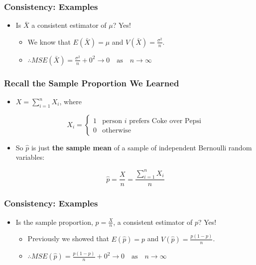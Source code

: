\documentclass[12pt]{beamer}
\begin{document}
\begin{frame}
	\frametitle{Consistency: Examples}
	
	\begin{itemize}[label={\color{blue}$\blacktriangleright$}]
		\item Is $\bar{X}$ a consistent estimator of $\mu$? Yes!
		\vspace{1cm}
		\begin{itemize}[label={\color{blue}$\blacktriangleright$}]
			\item We know that $E(\bar{X}) = \mu$ and $V(\bar{X}) = \frac{\sigma^2}{n}$.
			\item[] $\therefore MSE(\bar{X}) = \frac{\sigma^2}{n} + 0^2 \to 0 \quad \text{as} \quad n \to \infty$
		\end{itemize}
	\end{itemize}

\end{frame}
\begin{frame}
	\frametitle{Recall the Sample Proportion We Learned}
	
	\begin{itemize}[label={\color{blue}$\blacktriangleright$}]
		\item $X = \sum_{i=1}^n X_i$, where
		
		\[
		X_i = \begin{cases}
			1 & \text{person $i$ prefers Coke over Pepsi} \\
			0 & \text{otherwise}
		\end{cases}
		\]
		
		\item So $\hat{p}$ is just {\bf the sample mean} of a sample of independent Bernoulli random variables:
		
		\[
		\hat{p} = \frac{X}{n} = \frac{\sum_{i=1}^n X_i}{n}
		\]
	\end{itemize}
	
\end{frame}
\begin{frame}
	\frametitle{Consistency: Examples}
\begin{itemize}[label={\color{blue}$\blacktriangleright$}]
		\item Is the sample proportion, $\hat{p} = \frac{X}{n}$, a consistent estimator of $p$? Yes!
		\vspace{1cm}
		\begin{itemize}[label={\color{blue}$\blacktriangleright$}]
			\item Previously we showed that $E(\hat{p}) = p$ and $V(\hat{p}) = \frac{p(1-p)}{n}$.
			\item[] $\therefore MSE(\hat{p}) = \frac{p(1-p)}{n} + 0^2 \to 0 \quad \text{as} \quad n \to \infty$
		\end{itemize}
	\end{itemize}
	
\end{frame}
\end{document}
